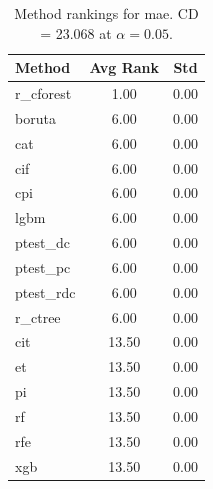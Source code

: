 \begin{table}[h]
\centering
\caption{Method rankings for mae. CD = 23.068 at $\alpha=0.05$.}
\label{tab:ranks_mae}
\begin{tabular}{lcc}
\toprule
Method & Avg Rank & Std \\
\midrule
r_cforest & 1.00 & 0.00 \\
boruta & 6.00 & 0.00 \\
cat & 6.00 & 0.00 \\
cif & 6.00 & 0.00 \\
cpi & 6.00 & 0.00 \\
lgbm & 6.00 & 0.00 \\
ptest_dc & 6.00 & 0.00 \\
ptest_pc & 6.00 & 0.00 \\
ptest_rdc & 6.00 & 0.00 \\
r_ctree & 6.00 & 0.00 \\
cit & 13.50 & 0.00 \\
et & 13.50 & 0.00 \\
pi & 13.50 & 0.00 \\
rf & 13.50 & 0.00 \\
rfe & 13.50 & 0.00 \\
xgb & 13.50 & 0.00 \\
\bottomrule
\end{tabular}
\end{table}